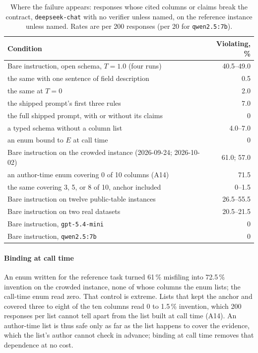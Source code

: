 \documentclass[journal]{IEEEtran}
\begin{document}
\begin{table}[!htbp]
\caption{Where the failure appears: responses whose cited columns or claims
break the contract, \texttt{deepseek-chat} with no verifier unless named, on
the reference instance unless named. Rates are per 200 responses (per 20 for
\texttt{qwen2.5:7b}).}
\label{tab:conditions}
\centering
\footnotesize
\setlength{\tabcolsep}{3pt}
\begin{tabular}{@{}p{5.3cm}r@{}}
\toprule
Condition & Violating, \% \\
\midrule
Bare instruction, open schema, $T=1.0$ (four runs) & 40.5--49.0 \\
\quad the same with one sentence of field description & 0.5 \\
\quad the same at $T=0$ & 2.0 \\
\quad the shipped prompt's first three rules & 7.0 \\
\quad the full shipped prompt, with or without its claims & 0 \\
\quad a typed schema without a column list & 4.0--7.0 \\
\quad an enum bound to $E$ at call time & 0 \\
Bare instruction on the crowded instance (2026-09-24; 2026-10-02) & 61.0; 57.0 \\
\quad an author-time enum covering 0 of 10 columns (A14) & 71.5 \\
\quad the same covering 3, 5, or 8 of 10, anchor included & 0--1.5 \\
Bare instruction on twelve public-table instances & 26.5--55.5 \\
Bare instruction on two real datasets & 20.5--21.5 \\
Bare instruction, \texttt{gpt-5.4-mini} & 0 \\
Bare instruction, \texttt{qwen2.5:7b} & 0 \\
\bottomrule
\end{tabular}
\end{table}

\paragraph{Binding at call time}
An enum written for the reference task turned 61\,\% misfiling into
72.5\,\% invention on the crowded instance, none of whose columns the enum
lists; the call-time enum read zero. That control is extreme. Lists that kept the
anchor and covered three to eight of the ten columns read 0 to 1.5\,\%
invention, which 200 responses per list cannot tell apart from the list built
at call time (A14). An author-time list is thus safe only as far as the list
happens to cover the evidence, which the list's author cannot check in
advance; binding at call time removes that dependence at no cost.
\end{document}
